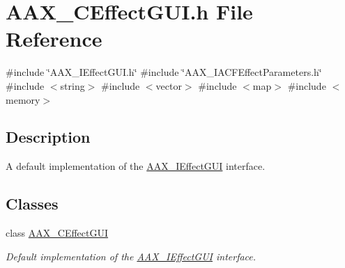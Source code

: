 \hypertarget{a00425}{}\section{A\+A\+X\+\_\+\+C\+Effect\+G\+U\+I.\+h File Reference}
\label{a00425}
{\ttfamily \#include \char`\"{}A\+A\+X\+\_\+\+I\+Effect\+G\+U\+I.\+h\char`\"{}}\newline
{\ttfamily \#include \char`\"{}A\+A\+X\+\_\+\+I\+A\+C\+F\+Effect\+Parameters.\+h\char`\"{}}\newline
{\ttfamily \#include $<$string$>$}\newline
{\ttfamily \#include $<$vector$>$}\newline
{\ttfamily \#include $<$map$>$}\newline
{\ttfamily \#include $<$memory$>$}\newline


\subsection{Description}
A default implementation of the \mbox{\hyperlink{a01821}{A\+A\+X\+\_\+\+I\+Effect\+G\+UI}} interface. 

\subsection*{Classes}
\begin{DoxyCompactItemize}
\item 
class \mbox{\hyperlink{a01477}{A\+A\+X\+\_\+\+C\+Effect\+G\+UI}}
\begin{DoxyCompactList}\small\item\em Default implementation of the \mbox{\hyperlink{a01821}{A\+A\+X\+\_\+\+I\+Effect\+G\+UI}} interface. \end{DoxyCompactList}\end{DoxyCompactItemize}
